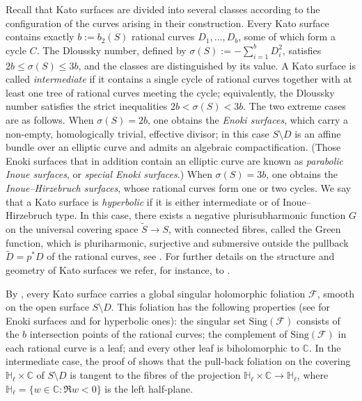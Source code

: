 \documentclass[12pt]{amsart}
\numberwithin{equation}{section}
\theoremstyle{remark}
\theoremstyle{definition}
\begin{document}
Recall that Kato surfaces are divided into several classes according to the configuration of the curves arising in their construction. Every Kato surface contains exactly $b:=b_2(S)$ rational curves $D_1,\dots,D_b$, some of which form a cycle $C$. The Dloussky number, defined by
$\sigma(S):=-\sum_{i=1}^b D_i^2$, satisfies $2b\leq\sigma(S)\leq 3b$, and the classes are distinguished by its value.
A Kato surface is called \emph{intermediate} if it contains a single cycle of rational curves together with at least one tree of rational curves meeting the cycle; equivalently, the Dloussky number satisfies the strict inequalities $2b<\sigma(S)<3b$.
The two extreme cases are as follows.
When $\sigma(S)=2b$, one obtains the \emph{Enoki surfaces}, which carry a non-empty, homologically trivial, effective divisor; in this case $S\setminus D$ is an affine bundle over an elliptic curve and admits an algebraic compactification. (Those Enoki surfaces that in addition contain an elliptic curve are known as \emph{parabolic Inoue surfaces}, or \emph{special Enoki surfaces}.)
When $\sigma(S)=3b$, one obtains the \emph{Inoue--Hirzebruch surfaces}, whose rational curves form one or two cycles.
We say that a Kato surface is \emph{hyperbolic} if it is either intermediate or of Inoue--Hirzebruch type.
In this case, there exists a negative plurisubharmonic function $G$ on the universal covering space $\tilde S \to S$, with connected fibres, called the Green function, which is pluriharmonic, surjective and submersive outside the pullback $\tilde D = p^*D$ of the rational curves, see \cite[Corollary 2.13]{DO}.
For further details on the structure and geometry of Kato surfaces we refer, for instance, to \cite{dloussky-Kato, BHPV, teleman-LNM}.

By \cite{dloussky-kohler, DO}, every Kato surface carries a global singular holomorphic foliation $\mathcal F$, smooth on the open surface $S\setminus D$.
This foliation has the following properties (see \cite[Theorem~1.9]{dloussky-kohler} for Enoki surfaces and \cite[Theorem~2.14]{DO} for hyperbolic ones): the singular
set $\mathrm{Sing}(\mathcal F)$ consists of the $b$ intersection points of the rational curves; the complement of $\mathrm{Sing}(\mathcal F)$ in each rational curve is a leaf; and every other leaf is biholomorphic to $\mathbb C$.
In the intermediate case, the proof of \cite[Theorem 5.6]{DO} shows that the pull-back foliation on the covering $\mathbb H_\ell\times\mathbb C$ of $S\setminus D$ is tangent to the fibres of the projection $\mathbb H_\ell\times\mathbb C\to\mathbb H_\ell$, where $\mathbb H_\ell=\{w\in\mathbb C:\Re w<0\}$ is the left half-plane.
\end{document}
